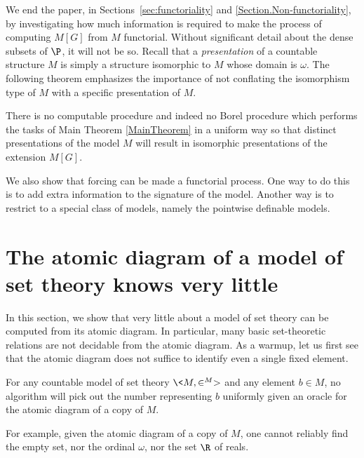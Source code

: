 \documentclass{amsart}
\begin{document}
We end the paper, in Sections~\ref{sec:functoriality} and \ref{Section.Non-functoriality}, by investigating how much
information is required to make the process of computing $M[G]$ from $M$ functorial.  Without significant detail
about the dense subsets of $\P$, it will not be so.  Recall that a \emph{presentation} of a countable structure $M$
is simply a structure isomorphic to $M$ whose domain is $\omega$.  The following theorem emphasizes the importance of not conflating the isomorphism type of $M$ with a specific presentation of $M$.

\begin{maintheorem}\label{MainTheorem.Nonfunctoriality}
  There is no computable procedure and indeed no Borel procedure which performs the tasks of Main Theorem \ref{MainTheorem} in a uniform way so that distinct presentations of the model $M$ will result in isomorphic presentations of the extension $M[G]$.
\end{maintheorem}

We also show that forcing can be made a functorial process. One way to do this is to add extra information to the signature of the model. Another way is to restrict to a special class of models, namely the pointwise definable models.

\section{The atomic diagram of a model of set theory knows very little}\label{Section.Atomic-diagram-knows-little}

In this section, we show that very little about a model of set theory can be computed from its atomic diagram. In particular, many basic set-theoretic relations are not decidable from the atomic diagram. As a warmup, let us first see that the atomic diagram does not suffice to identify even a single fixed element.

\begin{proposition}\label{Proposition.Atomic-diagram-knows-little}
 For any countable model of set theory $\<M,\in^M>$ and any element $b\in M$, no algorithm will pick out the number representing $b$ uniformly given an oracle for the atomic diagram of a copy of $M$.
\end{proposition}

For example, given the atomic diagram of a copy of $M$, one cannot reliably find the empty set, nor the ordinal $\omega$, nor the set $\R$ of reals.
\end{document}
